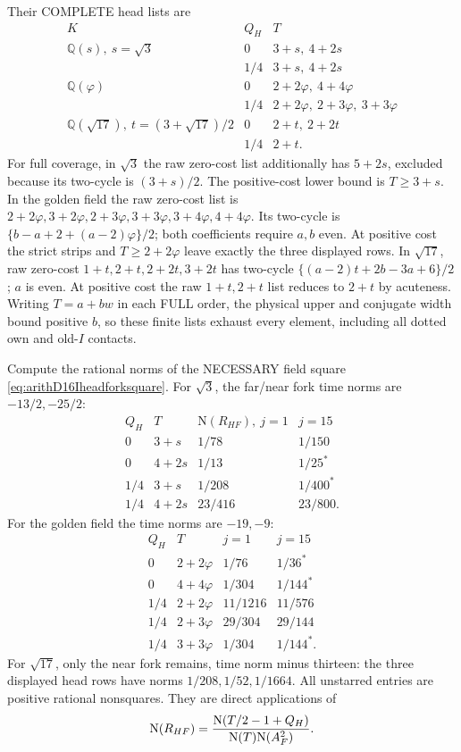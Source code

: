 \documentclass[11pt]{article}
\begin{document}
Their COMPLETE head lists are
\[
\begin{array}{c|c|l}
 K&Q_H&T\\ \hline
 \mathbb Q(s),\ s=\sqrt3&0&3+s,\ 4+2s\\
 &1/4&3+s,\ 4+2s\\
 \mathbb Q(\varphi)&0&2+2\varphi,\ 4+4\varphi\\
 &1/4&2+2\varphi,\ 2+3\varphi,\ 3+3\varphi\\
 \mathbb Q(\sqrt{17}),\ t=(3+\sqrt{17})/2&0&2+t,\ 2+2t\\
 &1/4&2+t .
\end{array}
\]
For full coverage, in \(\sqrt3\) the
raw zero-cost list additionally has
\(5+2s\), excluded because its two-cycle
is \((3+s)/2\).
The positive-cost lower bound is \(T\ge3+s\).
In the golden field the raw zero-cost
list is
\(2+2\varphi,3+2\varphi,2+3\varphi,
3+3\varphi,3+4\varphi,4+4\varphi\).
Its two-cycle is
\(\{b-a+2+(a-2)\varphi\}/2\);
both coefficients require \(a,b\) even.
At positive cost the strict strips and
\(T\ge2+2\varphi\) leave exactly the
three displayed rows.
In \(\sqrt{17}\), raw zero-cost
\(1+t,2+t,2+2t,3+2t\) has two-cycle
\(\{(a-2)t+2b-3a+6\}/2\);
\(a\) is even.
At positive cost the raw \(1+t,2+t\)
list reduces to \(2+t\) by acuteness.
Writing \(T=a+bw\) in each FULL order,
the physical upper and conjugate width
bound positive \(b\), so these finite
lists exhaust every element, including
all dotted own and old-\(I\) contacts.

Compute the rational norms of the
NECESSARY field square
\eqref{eq:arithD16Iheadforksquare}.
For \(\sqrt3\), the far/near fork
time norms are \(-13/2,-25/2\):
\[
\begin{array}{c|c|cc}
 Q_H&T&\mathrm N(R_{HF}),\ j=1&j=15\\ \hline
0&3+s&1/78&1/150\\
0&4+2s&1/13&1/25^*\\
1/4&3+s&1/208&1/400^*\\
1/4&4+2s&23/416&23/800 .
\end{array}
\]
For the golden field the time norms
are \(-19,-9\):
\[
\begin{array}{c|c|cc}
 Q_H&T&j=1&j=15\\ \hline
0&2+2\varphi&1/76&1/36^*\\
0&4+4\varphi&1/304&1/144^*\\
1/4&2+2\varphi&11/1216&11/576\\
1/4&2+3\varphi&29/304&29/144\\
1/4&3+3\varphi&1/304&1/144^* .
\end{array}
\]
For \(\sqrt{17}\), only the near
fork remains, time norm minus thirteen:
the three displayed head rows have
norms \(1/208,1/52,1/1664\).
All unstarred entries are positive
rational nonsquares.
They are direct applications of
\[
 \mathrm N(R_{HF})=
 {\mathrm N(T/2-1+Q_H)\over\mathrm N(T)\mathrm N(A_F^2)} .
\]
\end{document}
